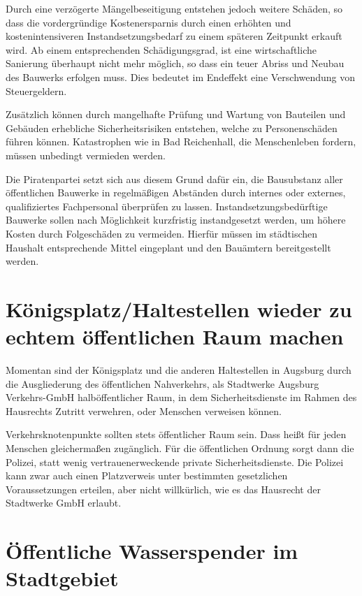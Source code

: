   Durch eine verzögerte Mängelbeseitigung entstehen jedoch weitere Schäden, so 
  dass die vordergründige Kostenersparnis durch einen erhöhten und 
  kostenintensiveren Instandsetzungsbedarf zu einem späteren Zeitpunkt erkauft 
  wird. Ab einem entsprechenden Schädigungsgrad, ist eine wirtschaftliche 
  Sanierung überhaupt nicht mehr möglich, so dass ein teuer Abriss und Neubau 
  des Bauwerks erfolgen muss. Dies bedeutet im Endeffekt eine Verschwendung 
  von Steuergeldern.
  
  Zusätzlich können durch mangelhafte Prüfung und Wartung von Bauteilen und 
  Gebäuden erhebliche Sicherheitsrisiken entstehen, welche zu Personenschäden 
  führen können. Katastrophen wie in Bad Reichenhall, die Menschenleben 
  fordern, müssen unbedingt vermieden werden.
  
  Die Piratenpartei setzt sich aus diesem Grund dafür ein, die Bausubstanz 
  aller öffentlichen Bauwerke in regelmäßigen Abständen durch internes oder 
  externes, qualifiziertes Fachpersonal überprüfen zu lassen. 
  Instandsetzungsbedürftige Bauwerke sollen nach Möglichkeit kurzfristig 
  instandgesetzt werden, um höhere Kosten durch Folgeschäden zu vermeiden. 
  Hierfür müssen im städtischen Haushalt entsprechende Mittel eingeplant und 
  den Bauämtern bereitgestellt werden.
  
  \section{Königsplatz/Haltestellen wieder zu echtem öffentlichen Raum machen}
  
  Momentan sind der Königsplatz und die anderen Haltestellen in Augsburg durch 
  die Ausgliederung des öffentlichen Nahverkehrs, als Stadtwerke Augsburg 
  Verkehrs-GmbH halböffentlicher Raum, in dem Sicherheitsdienste im Rahmen des 
  Hausrechts Zutritt verwehren, oder Menschen verweisen können.
  
  Verkehrsknotenpunkte sollten stets öffentlicher Raum sein. Dass heißt für 
  jeden Menschen gleichermaßen zugänglich. Für die öffentlichen Ordnung sorgt 
  dann die Polizei, statt wenig vertrauenerweckende private
  Sicherheitsdienste. Die Polizei kann zwar auch einen Platzverweis unter 
  bestimmten gesetzlichen Voraussetzungen erteilen, aber nicht willkürlich, 
  wie es das Hausrecht der Stadtwerke GmbH erlaubt.
  
  \section{Öffentliche Wasserspender im Stadtgebiet}
  
